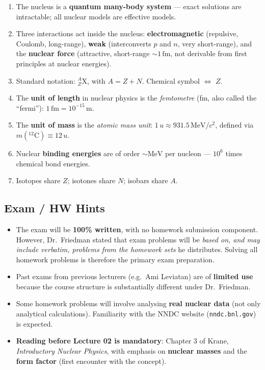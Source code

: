 \begin{enumerate}
  \item The nucleus is a \textbf{quantum many-body system} — exact
    solutions are intractable; all nuclear models are effective models.
  \item Three interactions act inside the nucleus: \textbf{electromagnetic}
    (repulsive, Coulomb, long-range), \textbf{weak} (interconverts $p$
    and $n$, very short-range), and the \textbf{nuclear force}
    (attractive, short-range $\sim1\,\mathrm{fm}$, not derivable from
    first principles at nuclear energies).
  \item Standard notation: ${}^{A}_{Z}\mathrm{X}$, with
    $A = Z + N$.  Chemical symbol $\Leftrightarrow$ $Z$.
  \item The \textbf{unit of length} in nuclear physics is the
    \emph{femtometre} (fm, also called the ``fermi''):
    $1\,\mathrm{fm} = 10^{-15}\,\mathrm{m}$.
  \item The \textbf{unit of mass} is the \emph{atomic mass unit}:
    $1\,u \approx 931.5\,\mathrm{MeV}/c^{2}$, defined via
    $m({}^{12}\mathrm{C}) \equiv 12\,u$.
  \item Nuclear \textbf{binding energies} are of order
    $\sim\mathrm{MeV}$ per nucleon — $10^{6}$ times chemical bond
    energies.
  \item Isotopes share $Z$; isotones share $N$; isobars share $A$.
\end{enumerate}


\subsection*{Exam / HW Hints}

\begin{itemize}
  \item The exam will be \textbf{100\% written}, with no homework
    submission component.  However, Dr.\ Friedman stated that exam
    problems will be \emph{based on, and may include verbatim,
    problems from the homework sets} he distributes.  Solving all
    homework problems is therefore the primary exam preparation.
  \item Past exams from previous lecturers (e.g.\ Ami Leviatan) are of
    \textbf{limited use} because the course structure is substantially
    different under Dr.\ Friedman.
  \item Some homework problems will involve analysing \textbf{real
    nuclear data} (not only analytical calculations).  Familiarity
    with the NNDC website (\texttt{nndc.bnl.gov}) is expected.
  \item \textbf{Reading before Lecture 02 is mandatory}: Chapter 3 of
    Krane, \textit{Introductory Nuclear Physics}, with emphasis on
    \textbf{nuclear masses} and the \textbf{form factor} (first
    encounter with the concept).
\end{itemize}

